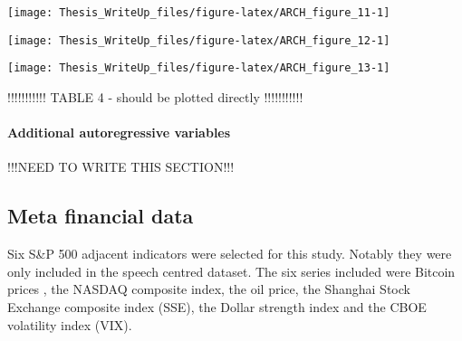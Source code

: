 \documentclass[11pt,preprint, authoryear]{elsarticle}
\let\origfigure\figure
\let\endorigfigure\endfigure
\renewenvironment{figure}[1][2] {
    \expandafter\origfigure\expandafter[H]
} {
    \endorigfigure
}
\numberwithin{equation}{section}
\numberwithin{figure}{section}
\numberwithin{table}{section}
\begin{document}
\begin{figure}[H]

{\centering \texttt{[image: Thesis\_WriteUp\_files/figure-latex/ARCH\_figure\_11-1]} 

}

\caption{Autocorrelation and partial-autocorrelation functions of model 4 residuals \label{Figure9}}\label{fig:ARCH_figure_11}
\end{figure}

\begin{figure}[H]

{\centering \texttt{[image: Thesis\_WriteUp\_files/figure-latex/ARCH\_figure\_12-1]} 

}

\caption{Autocorrelation and partial-autocorrelation functions of model 5 residuals \label{Figure9}}\label{fig:ARCH_figure_12}
\end{figure}

\begin{figure}[H]

{\centering \texttt{[image: Thesis\_WriteUp\_files/figure-latex/ARCH\_figure\_13-1]} 

}

\caption{Autocorrelation and partial-autocorrelation functions of model 6 residuals \label{Figure9}}\label{fig:ARCH_figure_13}
\end{figure}

!!!!!!!!!!! TABLE 4 - should be plotted directly !!!!!!!!!!!

\hypertarget{additional-autoregressive-variables}{%
\paragraph{\texorpdfstring{Additional autoregressive variables
\label{addAuto}}{Additional autoregressive variables }}\label{additional-autoregressive-variables}}

!!!NEED TO WRITE THIS SECTION!!!

\hypertarget{meta-financial-data}{%
\subsection{Meta financial data}\label{meta-financial-data}}

Six S\&P 500 adjacent indicators were selected for this study. Notably
they were only included in the speech centred dataset. The six series
included were Bitcoin prices , the NASDAQ composite index, the oil
price, the Shanghai Stock Exchange composite index (SSE), the Dollar
strength index and the CBOE volatility index (VIX).
\end{document}
